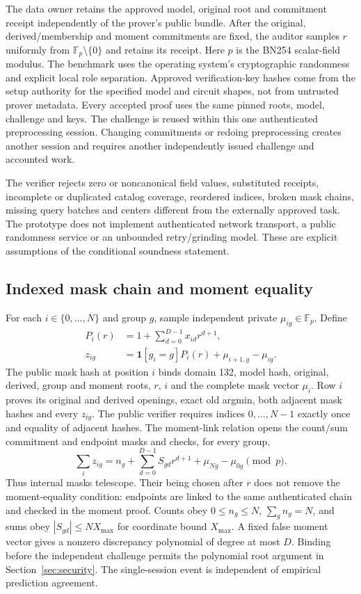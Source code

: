 The data owner retains the approved model, original root and commitment
receipt independently of the prover's public bundle. After the original,
derived/membership and moment commitments are fixed, the auditor samples
$r$ uniformly from $\mathbb F_p\setminus\{0\}$ and retains its receipt.
Here $p$ is the BN254 scalar-field modulus. The benchmark uses the operating
system's cryptographic randomness and explicit local role separation.
Approved verification-key hashes come from the setup authority for the
specified model and circuit shapes, not from untrusted prover metadata.
Every accepted proof uses the same pinned roots, model, challenge and keys.
The challenge is reused within this one authenticated preprocessing session.
Changing commitments or redoing preprocessing creates another session and
requires another independently issued challenge and accounted work.

The verifier rejects zero or noncanonical field values, substituted receipts,
incomplete or duplicated catalog coverage, reordered indices, broken mask
chains, missing query batches and centers different from the externally
approved task. The prototype does not implement authenticated network
transport, a public randomness service or an unbounded retry/grinding model.
These are explicit assumptions of the conditional soundness statement.

\subsection{Indexed mask chain and moment equality}
For each $i\in\{0,\ldots,N\}$ and group $g$, sample independent private
$\mu_{ig}\in\mathbb F_p$. Define
\begin{align}
 P_i(r)&=1+\sum_{d=0}^{D-1}x_{id}r^{d+1},\\
 z_{ig}&=\mathbf1[g_i=g]P_i(r)+\mu_{i+1,g}-\mu_{ig}.
\end{align}
The public mask hash at position $i$ binds domain 132, model hash, original,
derived, group and moment roots, $r$, $i$ and the complete mask vector
$\mu_i$. Row $i$ proves its original and derived openings, exact old argmin,
both adjacent mask hashes and every $z_{ig}$. The public verifier requires
indices $0,\ldots,N-1$ exactly once and equality of adjacent hashes.
The moment-link relation opens the count/sum commitment and endpoint masks
and checks, for every group,
\begin{equation}
 \sum_i z_{ig}=n_g+\sum_{d=0}^{D-1}S_{gd}r^{d+1}
                       +\mu_{Ng}-\mu_{0g}\pmod p.
\end{equation}
Thus internal masks telescope. Their being chosen after $r$ does not remove
the moment-equality condition: endpoints are linked to the same authenticated
chain and checked in the moment proof. Counts obey $0\leq n_g\leq N$,
$\sum_g n_g=N$, and sums obey $|S_{gd}|\leq NX_{\max}$ for coordinate bound $X_{\max}$.
A fixed false moment vector gives a nonzero discrepancy polynomial of degree
at most $D$. Binding before the independent challenge permits the polynomial
root argument in Section~\ref{sec:security}. The single-session event is
independent of empirical prediction agreement.

